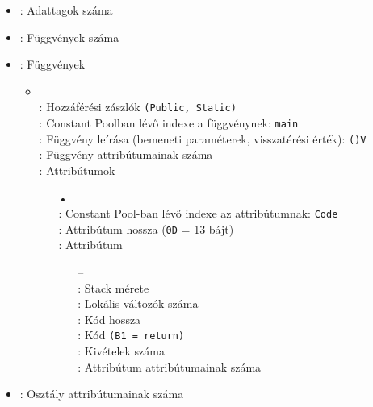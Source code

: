\begin{itemize}
\item {}: Adattagok száma
\item {}: Függvények száma
\item {}: Függvények
\begin{itemize}
    \setlength\itemsep{-5px}
    \item {}     \\
    : Hozzáférési zászlók \lstinline{(Public, Static)} \\
    : Constant Poolban lévő indexe a függvénynek: \lstinline{main} \\
    : Függvény leírása (bemeneti paraméterek, visszatérési érték): \lstinline{()V} \\
    : Függvény attribútumainak száma \\
    : Attribútumok
    \begin{itemize}
        \setlength\itemsep{-5px}
        \item[•]    \\
        : Constant Pool-ban lévő indexe az attribútumnak: \lstinline{Code} \\
        : Attribútum hossza (\lstinline{0D} = 13 bájt) \\
        : Attribútum
            \begin{itemize}
            \setlength\itemsep{0px}
                \item[–]       \\
                : Stack mérete  \\
                : Lokális változók száma \\
                : Kód hossza \\
                : Kód \lstinline{(B1 = return)}  \\
                : Kivételek száma \\
                : Attribútum attribútumainak száma
        \end{itemize}
    \end{itemize}
\end{itemize}
\item {}: Osztály attribútumainak száma
\end{itemize}